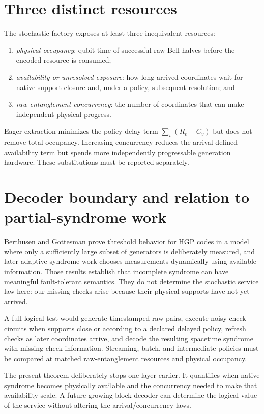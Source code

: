 \documentclass[aps,prx,reprint,superscriptaddress,nofootinbib,longbibliography,floatfix]{revtex4-2}
\begin{document}
\section{Three distinct resources}
The stochastic factory exposes at least three inequivalent resources:
\begin{enumerate}
\item \emph{physical occupancy}: qubit-time of successful raw Bell halves before the encoded resource is consumed;
\item \emph{availability or unresolved exposure}: how long arrived coordinates wait for native support closure and, under a policy, subsequent resolution; and
\item \emph{raw-entanglement concurrency}: the number of coordinates that can make independent physical progress.
\end{enumerate}
Eager extraction minimizes the policy-delay term $\sum_v(R_v-C_v)$ but does not remove total occupancy. Increasing concurrency reduces the arrival-defined availability term but spends more independently progressable generation hardware. These substitutions must be reported separately.

\section{Decoder boundary and relation to partial-syndrome work}
Berthusen and Gottesman prove threshold behavior for HGP codes in a model where only a sufficiently large subset of generators is deliberately measured, and later adaptive-syndrome work chooses measurements dynamically using available information. Those results establish that incomplete syndrome can have meaningful fault-tolerant semantics. They do not determine the stochastic service law here: our missing checks arise because their physical supports have not yet arrived.

A full logical test would generate timestamped raw pairs, execute noisy check circuits when supports close or according to a declared delayed policy, refresh checks as later coordinates arrive, and decode the resulting spacetime syndrome with missing-check information. Streaming, batch, and intermediate policies must be compared at matched raw-entanglement resources and physical occupancy.

The present theorem deliberately stops one layer earlier. It quantifies when native syndrome becomes physically available and the concurrency needed to make that availability scale. A future growing-block decoder can determine the logical value of the service without altering the arrival/concurrency laws.
\end{document}
